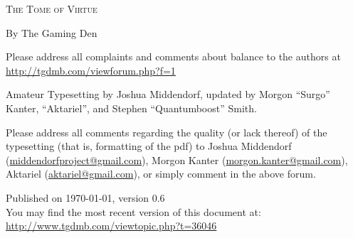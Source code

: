 \pagestyle{plain}

\begin{center} \Huge

\textsc{The Tome of Virtue}\end{center}



\vspace{2cm}
\begin{center}\large By The Gaming Den\end{center}


\newpage

\vspace*{4in}

\noindent Please address all complaints and comments about balance to the authors at\\
{\color{blue} \href{http://tgdmb.com/viewforum.php?f=1}{http://tgdmb.com/viewforum.php?f=1}}

\vspace{0.2in}



\noindent Amateur Typesetting by Joshua Middendorf, updated by Morgon ``Surgo'' Kanter, ``Aktariel'', and Stephen ``Quantumboost'' Smith.

\vspace{0.15in}

\noindent Please address all comments regarding the quality (or lack thereof) of the typesetting (that is, formatting of the pdf) to Joshua Middendorf (\href{mailto:middendorfproject@gmail.com}{middendorfproject@gmail.com}), Morgon Kanter (\href{mailto:morgon.kanter@gmail.com}{morgon.kanter@gmail.com}), Aktariel (\href{mailto:aktariel@gmail.com}{aktariel@gmail.com}), or simply comment in the above forum.





\vspace{1in}
\noindent Published on \today, version 0.6\\
\noindent You may find the most recent version of this document at:\\
{\color{blue} \href{http://www.tgdmb.com/viewtopic.php?t=36046}{http://www.tgdmb.com/viewtopic.php?t=36046}}

\newpage
